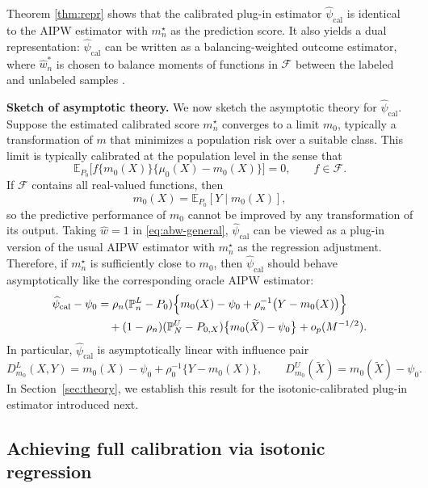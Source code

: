\documentclass{article}
\theoremstyle{plain}
\theoremstyle{definition}
\newcommand{\1}{\mathbbm{1}}
\newcommand{\psihat}{\widehat{\psi}_{\mathrm{cal}}}
\newcommand{\what}{\widehat w}
\newcommand{\rhozero}{\rho_0}
\newcommand{\rhon}{\rho_n}
\newcommand{\mtilde}{m_n^\star}
\newcommand{\Pl}{\mathbb{P}^{L}_n}
\newcommand{\Pu}{\mathbb{P}^{U}_N}
\newcommand{\Px}{P_{0,X}}
\begin{document}
Theorem \ref{thm:repr} shows that the calibrated plug-in estimator \(\psihat\) is identical to the AIPW estimator with \(\mtilde\) as the prediction score. It also yields a dual representation: \(\psihat\) can be written as a balancing-weighted outcome estimator, where \(\what_n^*\) is chosen to balance moments of functions in \(\mathcal F\) between the labeled and unlabeled samples \citep{chattopadhyay2020balancing}.

\textbf{Sketch of asymptotic theory.} We now sketch the asymptotic theory for \(\psihat\). Suppose the estimated calibrated score \(\mtilde\) converges to a limit \(m_0\), typically a transformation of \(m\) that minimizes a population risk over a suitable class. This limit is typically calibrated at the population level in the sense that
\[
\mathbb{E}_{P_0}\bigl[f\{m_0(X)\}\{\mu_0(X)-m_0(X)\}\bigr]=0,
\qquad
f\in\mathcal F.
\]
If \(\mathcal F\) contains all real-valued functions, then
\[
m_0(X)=\mathbb{E}_{P_0}\left[Y\mid m_0(X)\right],
\]
so the predictive performance of \(m_0\) cannot be improved by any transformation of its output. Taking \(\hat w=1\) in \eqref{eq:abw-general}, \(\psihat\) can be viewed as a plug-in version of the usual AIPW estimator with \(\mtilde\) as the regression adjustment. Therefore, if \(\mtilde\) is sufficiently close to \(m_0\), then \(\psihat\) should behave asymptotically like the corresponding oracle AIPW estimator:
\begin{align*}
\psihat-\psi_0
&=
\rhon(\Pl-P_0)\Bigl\{m_0(X)-\psi_0+\rhon^{-1}\bigl(Y-m_0(X)\bigr)\Bigr\}\\
&\quad+(1-\rhon)(\Pu-\Px)\bigl\{m_0(\widetilde X)-\psi_0\bigr\}
+o_p(M^{-1/2}).
\end{align*}
In particular, \(\psihat\) is asymptotically linear with influence pair
\[
D_{m_0}^L(X,Y)=m_0(X)-\psi_0+\rhozero^{-1}\{Y-m_0(X)\},
\qquad
D_{m_0}^U(\widetilde X)=m_0(\widetilde X)-\psi_0.
\]
In Section~\ref{sec:theory}, we establish this result for the isotonic-calibrated plug-in estimator introduced next.

\subsection{Achieving full calibration via isotonic regression}
\label{sec:iso}
\end{document}
